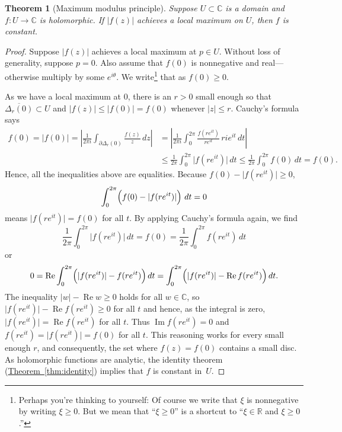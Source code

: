 \documentclass[12pt,openany]{book}
\renewcommand{\Re}{\operatorname{Re}}
\renewcommand{\Im}{\operatorname{Im}}
\newcommand{\sabs}[1]{\lvert {#1} \rvert}
\newcommand{\abs}[1]{\left\lvert {#1} \right\rvert}
\newcommand{\C}{{\mathbb{C}}}
\newcommand{\R}{{\mathbb{R}}}
\newcommand{\myquote}[1]{``#1''}
\theoremstyle{plain}
\newtheorem{thm}{Theorem}[section]
\theoremstyle{remark}
\theoremstyle{definition}
\theoremstyle{exercise}
\theoremstyle{example}
\newcommand{\thmref}[1]{\hyperref[#1]{Theorem~\ref*{#1}}}
\begin{document}
\begin{thm}[Maximum modulus principle]
%
%
Suppose $U \subset \C$ is a domain and
$f \colon U \to \C$ is holomorphic.
If $\sabs{f(z)}$ achieves a local maximum on $U$, then $f$ is constant.
\end{thm}

\begin{proof}
Suppose $\sabs{f(z)}$ achieves a local maximum at $p \in U$.
Without loss of generality, suppose $p = 0$.
Also assume that $f(0)$ is nonnegative and real---otherwise multiply by 
some $e^{i\theta}$.
We write\footnote{%
Perhaps you're thinking to yourself: Of course we write that $\xi$ is
nonnegative by writing $\xi \geq 0$.
But we mean that \myquote{$\xi \geq 0$}
is a shortcut to \myquote{$\xi \in \R$ and $\xi \geq 0$.}}
that as $f(0) \geq 0$.

As we have a local maximum at $0$,
there is an $r > 0$ small enough
so that
$\overline{\Delta_r(0)} \subset U$
and
$\sabs{f(z)} \leq \sabs{f(0)} = f(0)$ whenever $\sabs{z} \leq r$.
Cauchy's formula says
\begin{equation*}
\begin{split}
f(0) = \sabs{f(0)} =
\abs{\frac{1}{2\pi i}
\int_{\partial \Delta_r(0)}
\frac{f(z)}{z} \, dz
}
& =
\abs{
\frac{1}{2\pi i}
\int_0^{2\pi}
\frac{f(re^{it})}{re^{it}} \, ri e^{it} \, dt
}
\\
& \leq
\frac{1}{2\pi}
\int_0^{2\pi}
\sabs{f(re^{it})}\, dt
\leq
\frac{1}{2\pi}
\int_0^{2\pi}
f(0)\, dt = f(0) .
\end{split}
\end{equation*}
Hence, all the inequalities above are equalities.
Because $f(0)-\sabs{f(re^{it})} \geq 0$,
\begin{equation*}
\int_0^{2\pi}\Bigl( f(0)-\sabs{f(re^{it})} \Bigr) \ dt = 0
\end{equation*}
means $\sabs{f(re^{it})} = f(0)$ for all $t$.
By applying Cauchy's formula
again, we find
\begin{equation*}
\frac{1}{2\pi}
\int_0^{2\pi}
\sabs{f(re^{it})}\, dt
=
f(0)
=
\frac{1}{2\pi}
\int_0^{2\pi}
f(re^{it})\, dt
\end{equation*}
or
\begin{equation*}
0 =
\Re \int_0^{2\pi}
\Bigl(\sabs{f(re^{it})}-f(re^{it})\Bigr)\, dt
=
\int_0^{2\pi}
\Bigl(\sabs{f(re^{it})}-\Re f(re^{it})\Bigr)\, dt .
\end{equation*}
The inequality $\sabs{w} - \Re w \geq 0$ holds for all $w \in \C$,
so
$\sabs{f(re^{it})}-\Re f(re^{it}) \geq 0$ for all $t$ and hence,
as the integral is zero,
$\sabs{f(re^{it})}=\Re f(re^{it})$ for all $t$.
Thus $\Im f(re^{it}) = 0$
and 
$f(re^{it})=\sabs{f(re^{it})} = f(0)$ for all $t$.
This reasoning works for every small enough $r$, and consequently, the set where
$f(z) = f(0)$ contains a small disc.  As holomorphic functions are analytic,
the identity theorem (\thmref{thm:identity}) implies that $f$ is constant
in~$U$.
\end{proof}
\end{document}
